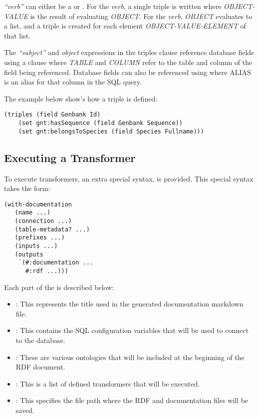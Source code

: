 \textit{``verb''} can either be a  or .  For the  \textit{verb}, a single triple  is written where \textit{OBJECT-VALUE} is the result of evaluating \textit{OBJECT}.  For the  \textit{verb}, \textit{OBJECT} evaluates to a list, and a triple  is created for each element \textit{OBJECT-VALUE-ELEMENT} of that list.

The \textit{``subject''} and \textit{object} expressions in the triples clause reference database fields using a  clause where \textit{TABLE} and \textit{COLUMN} refer to the table and column of the field being referenced.  Database fields can also be referenced using  where ALIAS is an alias for that column in the SQL query.

The example below show's how a triple is defined:

\begin{Verbatim}[frame=single]
(triples (field Genbank Id)
    (set gnt:hasSequence (field Genbank Sequence))
    (set gnt:belongsToSpecies (field Species Fullname)))
\end{Verbatim}

\subsection{Executing a Transformer}

To execute transformers, an extra special syntax,  is provided.  This special syntax takes the form:

\begin{Verbatim}[frame=single]
(with-documentation
   (name ...)
   (connection ...)
   (table-metadata? ...)
   (prefixes ...)
   (inputs ...)
   (outputs
    `(#:documentation ...
      #:rdf ...)))
\end{Verbatim}


Each part of the  is described below:

\begin{itemize}
\item {}: This represents the title used in the generated documentation markdown file.
\item {}: This contains the SQL configuration variables that will be used to connect to the database.
\item {}: These are various ontologies that will be included at the beginning of the RDF document.
\item {}: This is a list of defined transformers that will be executed.
\item {}: This specifies the file path where the RDF and documentation files will be saved.
\end{itemize}

